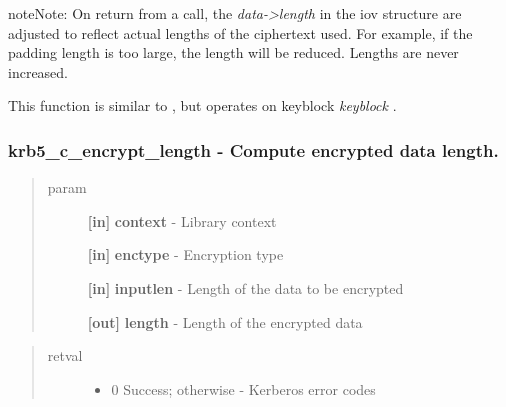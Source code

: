 \documentclass[letterpaper,10pt,english]{sphinxmanual}
\begin{document}


{\hyperref[appdev/refs/api/krb5_c_decrypt_iov:krb5_c_decrypt_iov]{}}



\begin{notice}{note}{Note:}
On return from a {\hyperref[appdev/refs/api/krb5_c_encrypt_iov:krb5_c_encrypt_iov]{}} call, the \emph{data-\textgreater{}length} in the iov structure are adjusted to reflect actual lengths of the ciphertext used. For example, if the padding length is too large, the length will be reduced. Lengths are never increased.

This function is similar to {\hyperref[appdev/refs/api/krb5_k_encrypt_iov:krb5_k_encrypt_iov]{}} , but operates on keyblock \emph{keyblock} .
\end{notice}


\subsubsection{krb5\_c\_encrypt\_length -  Compute encrypted data length.}
\label{appdev/refs/api/krb5_c_encrypt_length:krb5-c-encrypt-length-compute-encrypted-data-length}\label{appdev/refs/api/krb5_c_encrypt_length::doc}

\begin{fulllineitems}
\label{appdev/refs/api/krb5_c_encrypt_length:krb5_c_encrypt_length}
\end{fulllineitems}

\begin{quote}\begin{description}
\item[{param}] \leavevmode
\textbf{{[}in{]}} \textbf{context} - Library context

\textbf{{[}in{]}} \textbf{enctype} - Encryption type

\textbf{{[}in{]}} \textbf{inputlen} - Length of the data to be encrypted

\textbf{{[}out{]}} \textbf{length} - Length of the encrypted data

\end{description}\end{quote}
\begin{quote}\begin{description}
\item[{retval}] \leavevmode\begin{itemize}
\item {} 
0   Success; otherwise - Kerberos error codes

\end{itemize}

\end{description}\end{quote}
\end{document}
